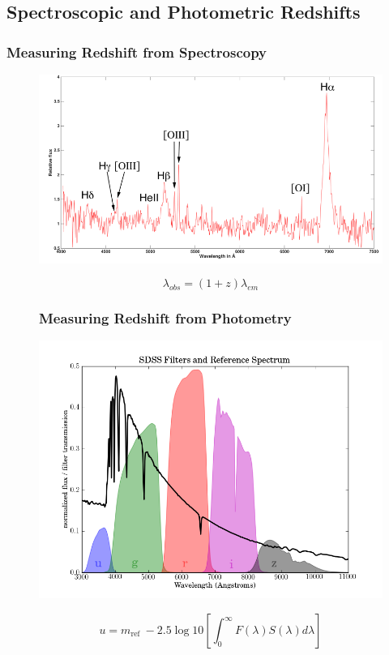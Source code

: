 \documentclass{beamer}
\begin{document}
\subsection{Spectroscopic and Photometric Redshifts}
\begin{frame}
	\frametitle{Measuring Redshift from Spectroscopy}
    \begin{figure}
        \includegraphics[scale=0.35]{img/Spectrum.png}
    \end{figure}
    \begin{equation}
        \lambda_{obs} = (1+z)\lambda_{em}
    \end{equation}
    \end{frame}
\begin{frame}
    \begin{figure}
	\frametitle{Measuring Redshift from Photometry}
        \includegraphics[scale=0.25]{img/sdss_plot.png}
    \end{figure}
    \begin{equation}
        u=m_{\text {ref }}-2.5 \log {10}\left[\int_{0}^{\infty} F(\lambda) S(\lambda) d \lambda\right]
    \end{equation}
    \end{frame}
\end{document}
